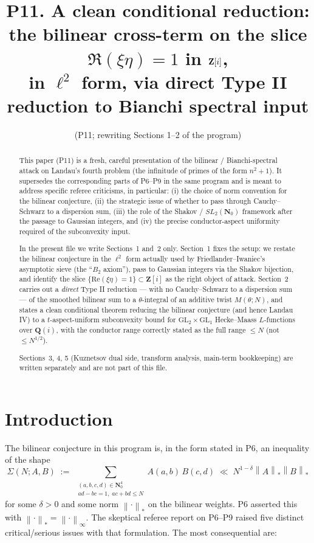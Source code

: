 \documentclass[11pt]{article}
\title{P11. A clean conditional reduction:\\
the bilinear cross-term on the slice $\Re(\xi\eta)=1$ in $\Zi$,\\
in $\ell^2$ form, via direct Type II reduction to Bianchi spectral input}
\author{(P11; rewriting Sections 1--2 of the program)}
\date{}
\theoremstyle{definition}
\newcommand{\Nz}{\mathbf{N}_0}
\newcommand{\Z}{\mathbf{Z}}
\newcommand{\Q}{\mathbf{Q}}
\newcommand{\Zi}{\Z[i]}
\newcommand{\Qi}{\Q(i)}
\newcommand{\SLNz}{SL_2(\Nz)}
\renewcommand{\Re}{\mathrm{Re}}
\newcommand{\norm}[1]{\left\lVert #1\right\rVert}
\begin{document}
\maketitle

\begin{abstract}
This paper (P11) is a fresh, careful presentation of the bilinear / Bianchi-spectral attack on Landau's fourth problem (the infinitude of primes of the form $n^2+1$). It supersedes the corresponding parts of P6--P9 in the same program and is meant to address specific referee criticisms, in particular: (i) the choice of norm convention for the bilinear conjecture, (ii) the strategic issue of whether to pass through Cauchy--Schwarz to a dispersion sum, (iii) the role of the Shakov / $\SLNz$ framework after the passage to Gaussian integers, and (iv) the precise conductor-aspect uniformity required of the subconvexity input.

In the present file we write Sections~1 and~2 only. Section~1 fixes the setup: we restate the bilinear conjecture in the $\ell^2$ form actually used by Friedlander--Iwaniec's asymptotic sieve (the ``$B_2$ axiom''), pass to Gaussian integers via the Shakov bijection, and identify the slice $\{\Re(\xi\eta)=1\}\subset\Zi$ as the right object of attack. Section~2 carries out a \emph{direct} Type II reduction --- with no Cauchy--Schwarz to a dispersion sum --- of the smoothed bilinear sum to a $\theta$-integral of an additive twist $M(\theta;N)$, and states a clean conditional theorem reducing the bilinear conjecture (and hence Landau IV) to a $t$-aspect-uniform subconvexity bound for $\mathrm{GL}_2\times\mathrm{GL}_1$ Hecke--Maass $L$-functions over $\Qi$, with the conductor range correctly stated as the full range $\le N$ (not $\le N^{1/2}$).

Sections~3, 4, 5 (Kuznetsov dual side, transform analysis, main-term bookkeeping) are written separately and are not part of this file.
\end{abstract}

\tableofcontents

\section*{Introduction}\label{sec:intro}

The bilinear conjecture in this program is, in the form stated in P6, an inequality of the shape
\[
\Sigma(N;A,B)\;:=\;\sum_{\substack{(a,b,c,d)\in\Nz^4\\ad-bc=1,\;ac+bd\le N}}A(a,b)\,B(c,d)\;\ll\;N^{1-\delta}\norm{A}_*\norm{B}_*
\]
for some $\delta>0$ and some norm $\norm{\cdot}_*$ on the bilinear weights. P6 asserted this with $\norm{\cdot}_*=\norm{\cdot}_\infty$. The skeptical referee report on P6--P9 raised five distinct critical/serious issues with that formulation. The most consequential are:
\end{document}
